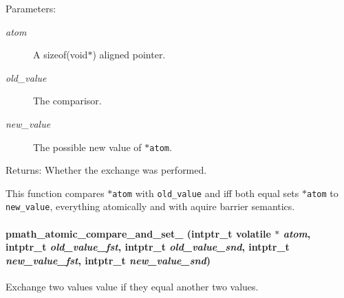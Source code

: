 \begin{Desc}
\item[Parameters:]
\begin{description}
\item[{\em atom}]A sizeof(void$\ast$) aligned pointer. \item[{\em old\_\-value}]The comparisor. \item[{\em new\_\-value}]The possible new value of {\tt $\ast$atom}. \end{description}
\end{Desc}
\begin{Desc}
\item[Returns:]Whether the exchange was performed.\end{Desc}
This function compares {\tt $\ast$atom} with {\tt old\_\-value} and iff both equal sets {\tt $\ast$atom} to {\tt new\_\-value}, everything atomically and with aquire barrier semantics. \hypertarget{group__atomic__ops_g868adc2a74d7aafbb0670922f61a21cc}{
\paragraph[{pmath\_\-atomic\_\-compare\_\-and\_\-set\_\-2}]{ pmath\_\-atomic\_\-compare\_\-and\_\-set\_ (intptr\_\-t volatile $\ast$ {\em atom}, \/  intptr\_\-t {\em old\_\-value\_\-fst}, \/  intptr\_\-t {\em old\_\-value\_\-snd}, \/  intptr\_\-t {\em new\_\-value\_\-fst}, \/  intptr\_\-t {\em new\_\-value\_\-snd})}\hfill}
\label{group__atomic__ops_g868adc2a74d7aafbb0670922f61a21cc}


Exchange two values value if they equal another two values. 

